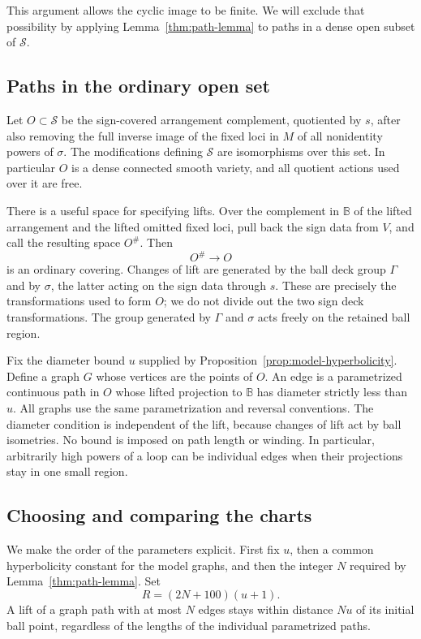 \documentclass[11pt,reqno]{amsart}
\numberwithin{equation}{section}
\theoremstyle{definition}
\theoremstyle{remark}
\newcommand{\BB}{\mathbb B}
\newcommand{\cS}{\mathcal S}
\begin{document}
This argument allows the cyclic image to be finite.  We will exclude
that possibility by applying Lemma~\ref{thm:path-lemma} to paths in a
dense open subset of $\cS$.

\subsection{Paths in the ordinary open set}

Let $O\subset\cS$ be the sign-covered arrangement complement,
quotiented by $s$, after also removing the full inverse image of the
fixed loci in $M$ of all nonidentity powers of $\sigma$.  The
modifications defining $\cS$ are isomorphisms over this set.  In
particular $O$ is a dense connected smooth variety, and all quotient
actions used over it are free.

There is a useful space for specifying lifts.  Over the complement in
$\BB$ of the lifted arrangement and the lifted omitted fixed loci,
pull back the sign data from $V$, and call the resulting space
$O^\#$.  Then
\[
 O^\#\longrightarrow O
\]
is an ordinary covering.  Changes of lift are generated by the ball
deck group $\Gamma$ and by $\sigma$, the latter acting on the sign data
through $s$.  These are precisely the transformations used to form
$O$; we do not divide out the two sign deck transformations.  The group generated by $\Gamma$ and $\sigma$ acts freely on the
retained ball region.

Fix the diameter bound $u$ supplied by
Proposition~\ref{prop:model-hyperbolicity}.  Define a graph $G$ whose
vertices are the points of $O$.  An edge is a parametrized continuous
path in $O$ whose lifted projection to $\BB$ has diameter strictly
less than $u$.  All graphs use the same parametrization and reversal
conventions.  The diameter condition is independent of the lift,
because changes of lift act by ball isometries.  No bound is imposed
on path length or winding.  In particular, arbitrarily high powers of
a loop can be individual edges when their projections stay in one
small region.

\subsection{Choosing and comparing the charts}

We make the order of the parameters explicit.  First fix $u$, then a
common hyperbolicity constant for the model graphs, and then the
integer $N$ required by Lemma~\ref{thm:path-lemma}.  Set
\begin{equation}\label{app:radius}
 R=(2N+100)(u+1).
\end{equation}
A lift of a graph path with at most $N$ edges stays within distance
$Nu$ of its initial ball point, regardless of the lengths of the
individual parametrized paths.
\end{document}
